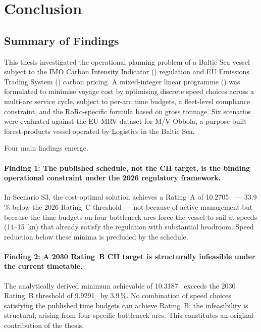 \section{Conclusion}
\label{ch:conclusion}

\subsection{Summary of Findings}
\label{sec:conc:summary}

This thesis investigated the operational planning problem of a Baltic Sea
\RoRo{} vessel subject to the IMO Carbon Intensity Indicator (\CII{})
regulation and EU Emissions Trading System (\ETS{}) carbon pricing.  A
mixed-integer linear programme (\MILP{}) was formulated to minimise
voyage cost by optimising discrete speed choices across a multi-arc
service cycle, subject to per-arc time budgets, a fleet-level \CII{}
compliance constraint, and the RoRo-specific \CII{} formula based on
gross tonnage.  Six scenarios were evaluated against the EU MRV dataset
for M/V Obbola, a purpose-built forest-products \RoRo{} vessel operated
by \SCA{} Logistics in the Baltic Sea.

Four main findings emerge.

\paragraph{Finding 1: The published schedule, not the CII target, is the
binding operational constraint under the 2026 regulatory framework.}
In Scenario S3, the cost-optimal solution achieves a Rating~A \CII{}
of 10.2705~\gGTnm{} --- 33.9\,\% below the 2026 Rating~C threshold ---
not because of active \CII{} management but because the time budgets on
four bottleneck arcs force the vessel to sail at speeds (14--15~kn) that
already satisfy the regulation with substantial headroom.  Speed reduction
below these minima is precluded by the schedule.

\paragraph{Finding 2: A 2030 Rating~B CII target is structurally
infeasible under the current timetable.}
The analytically derived minimum achievable \CII{} of 10.3187~\gGTnm{}
exceeds the 2030 Rating~B threshold of 9.9291~\gGTnm{} by 3.9\,\%.
No combination of speed choices satisfying the published time budgets
can achieve Rating~B; the infeasibility is structural, arising from
four specific bottleneck arcs.  This constitutes an original contribution
of the thesis.


